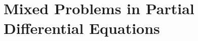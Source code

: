 \documentclass[a4paper,11pt]{book}
\begin{document}
\frontmatter

\tableofcontents





\thispagestyle{empty}


\part{Mixed Problems in Partial Differential Equations}

\mainmatter























\backmatter


\end{document}
